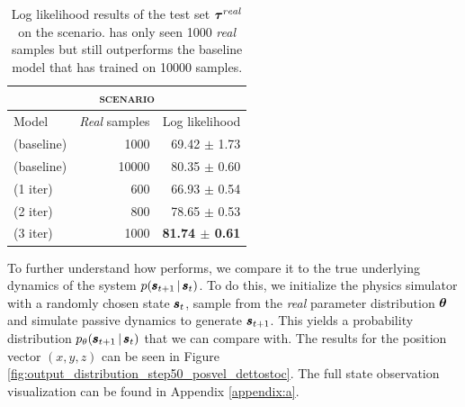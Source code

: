 \begin{table}
\centering

\begin{tabular}{lrr}
\multicolumn{3}{c}{\MakeLowercase{\textsc{\ws{} scenario}}} \\
\toprule
Model & \emph{Real} samples & Log likelihood  \\
\midrule

\cvae{} (baseline) & 1000 & 69.42 $\pm$ 1.73\\
\cvae{} (baseline) & 10000 & 80.35 $\pm$ 0.60\\

\dettostoc{} (1 iter) & 600 & 66.93 $\pm$ 0.54 \\
\dettostoc{} (2 iter) & 800 & 78.65 $\pm$ 0.53 \\

\dettostoc{} (3 iter) & 1000 & \textbf{81.74 $\pm$ 0.61} \\

\bottomrule
\end{tabular}
\bigskip

\caption{Log likelihood results of the test set $\boldsymbol{\tau}^{real}{}$ on the \ws{} scenario. \dettostoc{} has only seen 1000 \emph{real} samples but still outperforms the baseline model that has trained on 10000 samples.}
\label{table:windyslope_results}
\end{table}

To further understand how \dettostoc{} performs, we compare it to the true underlying dynamics of the system $p \given{\vns}{\vs}$. To do this, we initialize the physics simulator with a randomly chosen state $\pmb{s}_t$, sample from the \emph{real} parameter distribution $\boldsymbol{\theta}$ and simulate passive dynamics to generate $\pmb{s}_{t+1}$. This yields a probability distribution $\ptheta \given{\vns}{\vs}$ that we can compare with. The results for the position vector $(x,y,z)$ can be seen in Figure \ref{fig:output_distribution_step50_posvel_dettostoc}. The full state observation visualization can be found in Appendix \ref{appendix:a}.

